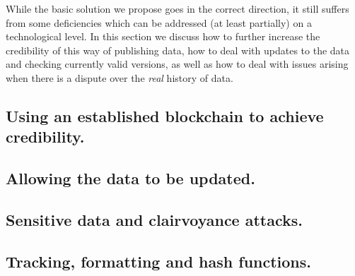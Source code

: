 

While the basic solution we propose goes in the correct direction, it still suffers from some deficiencies which can be addressed (at least partially) on a technological level. In this section we discuss how to further increase the credibility of this way of publishing data, how to deal with updates to the data and checking currently valid versions, as well as how to deal with issues arising when there is a dispute over the \emph{real} history of data. %

\subsection{Using an established blockchain to achieve credibility.}



\subsection{Allowing the data to be updated.}
\label{sec:updates}



%


\subsection{Sensitive data and clairvoyance attacks.}



\subsection{Tracking, formatting and hash functions.}



